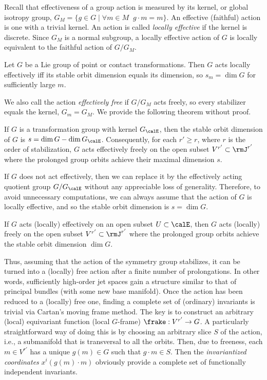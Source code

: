 Recall that effectiveness of a group action is measured by its kernel, or global isotropy group, $G_M=\{g\in G\mid \forall m\in M\;\; g\cdot m=m\}$. An effective (faithful) action is one with a trivial kernel. An action is called \emph{locally effective} if the kernel is discrete. Since $G_M$ is a normal subgroup, a locally effective action of $G$ is locally equivalent to the faithful action of $G\slash G_M$.

\begin{thm}
    Let $G$ be a Lie group of point or contact transformations. Then $G$ acts locally effectively iff its stable orbit dimension equals its dimension, so $s_m=\dim G$ for sufficiently large $m$.
\end{thm}

We also call the action \emph{effectively free} if $G\slash G_M$ acts freely, so every stabilizer equals the kernel, $G_m=G_M$. We provide the following theorem without proof.

\begin{cor}
    If $G$ is a transformation group with kernel $G_\calE$, then the stable orbit dimension of $G$ is $s=\dim G-\dim G_\calE$. Consequently, for each $r'\geq r$, where $r$ is the order of stabilization, $G$ acts effectively freely on the open subset $V^{r'}\subset \rmJ^{r'}$ where the prolonged group orbits achieve their maximal dimension $s$.
\end{cor}

If $G$ does not act effectively, then we can replace it by the effectively acting quotient group $G\slash G_\calE$ without any appreciable loss of generality. Therefore, to avoid unnecessary computations, we can always assume that the action of $G$ is locally effective, and so the stable orbit dimension is $s=\dim G$.

\begin{cor}
    If $G$ acts (locally) effectively on an open subset $U\subset \calE$, then $G$ acts (locally) freely on the open subset $V^{r'}\subset \rmJ^{r'}$ where the prolonged group orbits achieve the stable orbit dimension $\dim G$.
\end{cor}

Thus, assuming that the action of the symmetry group stabilizes, it can be turned into a (locally) free action after a finite number of prolongations. In other words, sufficiently high-order jet spaces gain a structure similar to that of principal bundles (with some new base manifold). Once the action has been reduced to a (locally) free one, finding a complete set of (ordinary) invariants is trivial via Cartan's moving frame method. The key is to construct an arbitrary (local) equivariant function (local $G$-frame) $\frake:V^{r'}\to G$. A particularly straightforward way of doing this is by choosing an arbitrary slice $S$ of the action, i.e., a submanifold that is transversal to all the orbits. Then, due to freeness, each $m\in V^{r'}$ has a unique $g(m)\in G$ such that $g\cdot m\in S$. Then the \emph{invariantized coordinates} $x^i(g(m)\cdot m)$ obviously provide a complete set of functionally independent invariants.


